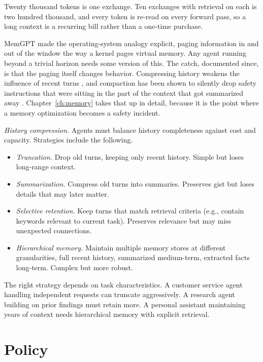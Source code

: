 Twenty thousand tokens is one exchange. Ten exchanges with retrieval on each is two hundred thousand, and every token is re-read on every forward pass, so a long context is a recurring bill rather than a one-time purchase.

MemGPT \cite{packer2023memgpt} made the operating-system analogy explicit, paging information in and out of the window the way a kernel pages virtual memory. Any agent running beyond a trivial horizon needs some version of this. The catch, documented since, is that the paging itself changes behavior. Compressing history weakens the influence of recent turns \cite{compressreliab2026}, and compaction has been shown to silently drop safety instructions that were sitting in the part of the context that got summarized away \cite{govdecay2026}. Chapter~\ref{ch:memory} takes that up in detail, because it is the point where a memory optimization becomes a safety incident.

\textit{History compression.} Agents must balance history completeness against cost and capacity. Strategies include the following.

\begin{itemize}
\item \textit{Truncation.} Drop old turns, keeping only recent history. Simple but loses long-range context.
\item \textit{Summarization.} Compress old turns into summaries. Preserves gist but loses details that may later matter.
\item \textit{Selective retention.} Keep turns that match retrieval criteria (e.g., contain keywords relevant to current task). Preserves relevance but may miss unexpected connections.
\item \textit{Hierarchical memory.} Maintain multiple memory stores at different granularities, full recent history, summarized medium-term, extracted facts long-term. Complex but more robust.
\end{itemize}

The right strategy depends on task characteristics. A customer service agent handling independent requests can truncate aggressively. A research agent building on prior findings must retain more. A personal assistant maintaining years of context needs hierarchical memory with explicit retrieval.

\section{Policy}

